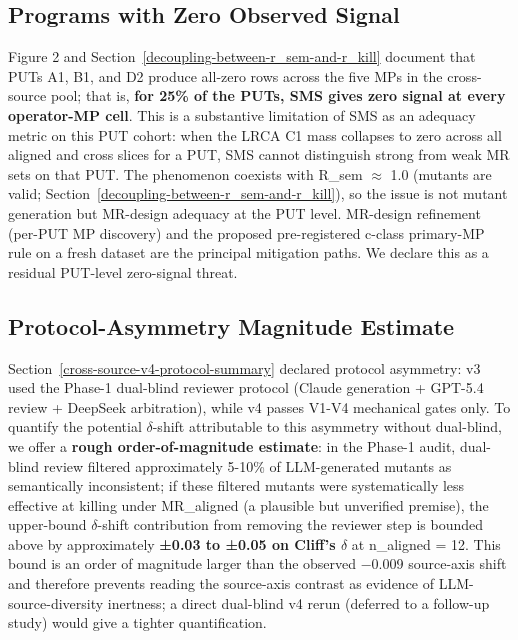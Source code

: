 \documentclass[12pt]{article}
\begin{document}
\subsection{Programs with Zero Observed Signal}\label{put-level-zero-mass-cohort}

Figure 2 and Section~\ref{decoupling-between-r_sem-and-r_kill} document that PUTs A1, B1, and D2 produce all-zero
rows across the five MPs in the cross-source pool; that is,
\textbf{for 25\% of the PUTs, SMS gives zero signal at every operator-MP
cell}. This is a substantive limitation of SMS as an adequacy metric on
this PUT cohort: when the LRCA C1 mass collapses to zero across all
aligned and cross slices for a PUT, SMS cannot distinguish strong from
weak MR sets on that PUT. The phenomenon coexists with R\_sem $\approx$ 1.0
(mutants are valid; Section~\ref{decoupling-between-r_sem-and-r_kill}), so the issue is not mutant generation but
MR-design adequacy at the PUT level. MR-design refinement (per-PUT
MP discovery) and the proposed pre-registered c-class primary-MP rule
on a fresh dataset are the principal mitigation paths. We declare this
as a residual PUT-level zero-signal threat.

\subsection{Protocol-Asymmetry Magnitude Estimate}\label{r13-protocol-asymmetry-magnitude-estimate}

Section~\ref{cross-source-v4-protocol-summary} declared protocol asymmetry: v3 used the Phase-1 dual-blind
reviewer protocol (Claude generation + GPT-5.4 review + DeepSeek
arbitration), while v4 passes V1-V4 mechanical gates only. To quantify
the potential $\delta$-shift attributable to this asymmetry without dual-blind,
we offer a \textbf{rough order-of-magnitude estimate}: in the Phase-1
audit, dual-blind review filtered approximately 5-10\% of LLM-generated
mutants as semantically inconsistent; if these filtered mutants were
systematically less effective at killing under MR\_aligned (a plausible
but unverified premise), the upper-bound $\delta$-shift contribution from
removing the reviewer step is bounded above by approximately
\textbf{±0.03 to ±0.05 on Cliff's $\delta$} at n\_aligned = 12. This bound is
an order of magnitude larger than the observed −0.009 source-axis shift
and therefore prevents reading the source-axis contrast as evidence of
LLM-source-diversity inertness; a direct dual-blind v4 rerun (deferred
to a follow-up study) would give a tighter quantification.
\end{document}

